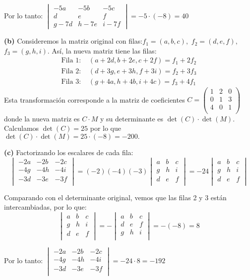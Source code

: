 \begin{prob}
\begin{myproof}
Por lo tanto: $\begin{vmatrix}
-5a&-5b&-5c\\d&e&f\\g-7d&h-7e&i-7f
\end{vmatrix} = -5 \cdot (-8) = 40$

\textbf{(b)} Consideremos la matriz original con filas:$f_1 = (a, b, c),$ $f_2 = (d, e, f),$ $f_3 = (g, h, i).$ Así, la nueva matriz tiene las filas:
\begin{align*}
\text{Fila 1: } & (a+2d, b+2e, c+2f) = f_1 + 2f_2 \\
\text{Fila 2: } & (d+3g, e+3h, f+3i) = f_2 + 3f_3 \\
\text{Fila 3: } & (g+4a, h+4b, i+4c) = f_3 + 4f_1
\end{align*}
Esta transformación corresponde a la matriz de coeficientes $
C = \begin{pmatrix}
1 & 2 & 0 \\
0 & 1 & 3 \\
4 & 0 & 1 \\
\end{pmatrix}$ donde la nueva matriz es $C \cdot M$ y su determinante es $\det(C) \cdot \det(M)$. Calculamos $\det(C)= 25$ por lo que $ \det(C) \cdot \det(M) = 25 \cdot (-8) = -200.$

\textbf{(c)} Factorizando los escalares de cada fila:
$$\begin{vmatrix}
-2a&-2b&-2c\\-4g&-4h&-4i\\-3d&-3e&-3f\\
\end{vmatrix} = (-2)(-4)(-3)\begin{vmatrix}
a&b&c\\g&h&i\\d&e&f\\
\end{vmatrix}= -24\begin{vmatrix}
a&b&c\\g&h&i\\d&e&f\\
\end{vmatrix}$$

Comparando con el determinante original, vemos que las filas 2 y 3 están intercambiadas, por lo que:
$$\begin{vmatrix}
a&b&c\\g&h&i\\d&e&f\\
\end{vmatrix} = -\begin{vmatrix}
a&b&c\\d&e&f\\g&h&i\\
\end{vmatrix} = -(-8) = 8$$

Por lo tanto: $\begin{vmatrix}
-2a&-2b&-2c\\-4g&-4h&-4i\\-3d&-3e&-3f\\
\end{vmatrix} = -24 \cdot 8 = -192$
\end{myproof}
\end{prob}

